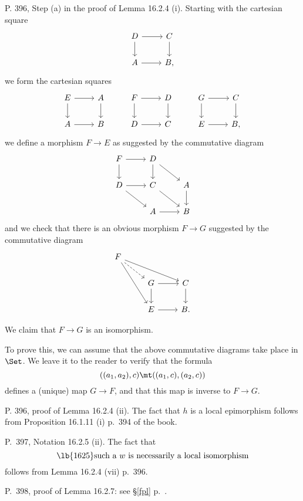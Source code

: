 \documentclass[12pt]{article}
\theoremstyle{remark}
\theoremstyle{definition}
\begin{document}
\begin{s}
P. 396, Step (a) in the proof of Lemma 16.2.4 (i). Starting with the cartesian square
$$
\begin{tikzcd}
D\ar[d]\ar[r]&C\ar[d]\\ 
A\ar[r]&B,
\end{tikzcd}
$$ 
we form the cartesian squares
$$
\begin{tikzcd}
E\ar[d]\ar[r]&A\ar[d]&F\ar[d]\ar[r]&D\ar[d]&G\ar[d]\ar[r]&C\ar[d]\\ 
A\ar[r]&B&D\ar[r]&C&E\ar[r]&B,
\end{tikzcd}
$$ 
we define a morphism $F\to E$ as suggested by the commutative diagram
$$
\begin{tikzcd}
F\ar[d]\ar[r]&D\ar[d]\ar[dr]\\ 
D\ar[dr]\ar[r]&C\ar[dr]&A\ar[d]\\ 
&A\ar[r]&B
\end{tikzcd}
$$ 
and we check that there is an obvious morphism $F\to G$ suggested by the commutative diagram
$$
\begin{tikzcd}
F\ar[rrd]\ar[rd,dashed]\ar[rdd]\\ 
&G\ar[d]\ar[r]&C\ar[d]\\ 
&E\ar[r]&B.
\end{tikzcd}
$$ 

We claim that $F\to G$ is an isomorphism. 

To prove this, we can assume that the above commutative diagrams take place in $\Set$. We leave it to the reader to verify that the formula 
$$
((a_1,a_2),c)\mt((a_1,c),(a_2,c))
$$ 
defines a (unique) map $G\to F$, and that this map is inverse to $F\to G$.
\end{s}

%

\begin{s}
P. 396, proof of Lemma 16.2.4 (ii). The fact that $h$ is a local epimorphism follows from Proposition 16.1.11 (i) p.~394 of the book.
\end{s}

%

\begin{s} 
P.~397, Notation 16.2.5 (ii). The fact that 
\begin{equation}\lb{1625}
\text{such a $w$ is necessarily a local isomorphism}
\end{equation}
follows from Lemma 16.2.4 (vii) p.~396.
\end{s}

%

\begin{s} 
P.~398, proof of Lemma 16.2.7: see \S\ref{fpl} p.~.
\end{s}
\end{document}
